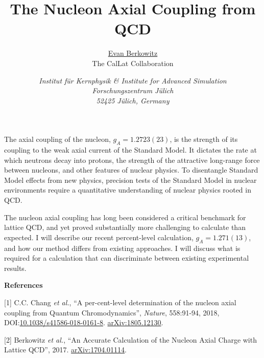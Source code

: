 \documentclass[a4paper,12pt]{article}                               %
\begin{document}
\title{The Nucleon Axial Coupling from QCD}

\author{\underline{Evan Berkowitz}\\ The CalLat Collaboration}
\date{\small \it
    Institut f\"{u}r Kernphysik \& Institute for Advanced Simulation \\ Forschungszentrum J\"{u}lich \\ 52425 J\"{u}lich, Germany
}

\maketitle

The axial coupling of the nucleon, $g_A=1.2723(23)$, is the strength of its coupling to the weak axial current of the Standard Model.
It dictates the rate at which neutrons decay into protons, the strength of the attractive long-range force between nucleons, and other features of nuclear physics.
To disentangle Standard Model effects from new physics, precision tests of the Standard Model in nuclear environments require a quantitative understanding of nuclear physics rooted in QCD.

The nucleon axial coupling has long been considered a critical benchmark for lattice QCD, and yet proved substantially more challenging to calculate than expected.
I will describe our recent percent-level calculation, $g_A=1.271(13)$, and how our method differs from existing approaches.
I will discuss what is required for a calculation that can discriminate between existing experimental results.


\vspace{32pt}

{\large \bf References}
\setlength{\parindent}{0cm}
\setlength{\parskip}{16pt}

[1] C.C. Chang \emph{et al.}, ``A per-cent-level determination of the nucleon axial coupling from Quantum Chromodynamics'', \emph{Nature}, 558:91-94, 2018, DOI:\href{https://doi.org/10.1038/s41586-018-0161-8}{10.1038/s41586-018-0161-8}.  \href{https://arxiv.org/abs/1805.12130}{arXiv:1805.12130}.

[2] Berkowitz \emph{et al.}, ``An Accurate Calculation of the Nucleon Axial Charge with Lattice QCD'', 2017.  \href{https://arxiv.org/abs/1704.01114}{arXiv:1704.01114}.
\end{document}
